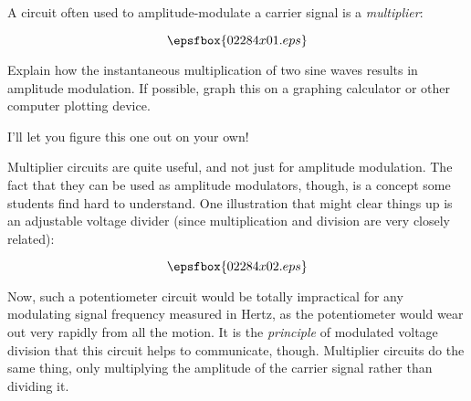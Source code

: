 

A circuit often used to amplitude-modulate a carrier signal is a {\it multiplier}:

$$\epsfbox{02284x01.eps}$$

Explain how the instantaneous multiplication of two sine waves results in amplitude modulation.  If possible, graph this on a graphing calculator or other computer plotting device.







I'll let you figure this one out on your own!







Multiplier circuits are quite useful, and not just for amplitude modulation.  The fact that they can be used as amplitude modulators, though, is a concept some students find hard to understand.  One illustration that might clear things up is an adjustable voltage divider (since multiplication and division are very closely related):

$$\epsfbox{02284x02.eps}$$

Now, such a potentiometer circuit would be totally impractical for any modulating signal frequency measured in Hertz, as the potentiometer would wear out very rapidly from all the motion.  It is the {\it principle} of modulated voltage division that this circuit helps to communicate, though.  Multiplier circuits do the same thing, only multiplying the amplitude of the carrier signal rather than dividing it.





